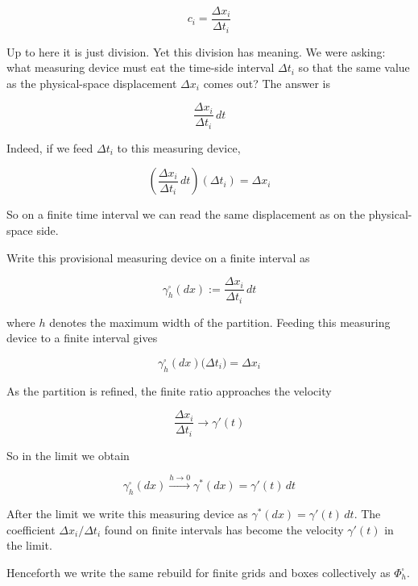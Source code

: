 \[c_i = \frac{\Delta x_i}{\Delta t_i}\]

Up to here it is just division. Yet this division has meaning. We were
asking: what measuring device must eat the time-side interval
\(\Delta t_i\) so that the same value as the physical-space displacement
\(\Delta x_i\) comes out? The answer is

\[\frac{\Delta x_i}{\Delta t_i}\,dt\]

Indeed, if we feed \(\Delta t_i\) to this measuring device,

\[\left(\frac{\Delta x_i}{\Delta t_i}\,dt\right)(\Delta t_i)=\Delta x_i\]

So on a finite time interval we can read the same displacement as on the
physical-space side.

Write this provisional measuring device on a finite interval as

\[\gamma_h^\square(dx):=\frac{\Delta x_i}{\Delta t_i}\,dt\]

where \(h\) denotes the maximum width of the partition. Feeding this
measuring device to a finite interval gives

\[\gamma_h^\square(dx)\bigl(\Delta t_i\bigr)=\Delta x_i\]

As the partition is refined, the finite ratio approaches the velocity

\[\frac{\Delta x_i}{\Delta t_i}\to \gamma'(t)\]

So in the limit we obtain

\[
\gamma_h^\square(dx)
\xrightarrow{h\to0}
\gamma^*(dx)
=
\gamma'(t)\,dt
\]

After the limit we write this measuring device as
\(\gamma^*(dx)=\gamma'(t)\,dt\). The coefficient
\(\Delta x_i/\Delta t_i\) found on finite intervals has become the
velocity \(\gamma'(t)\) in the limit.

Henceforth we write the same rebuild for finite grids and boxes
collectively as \(\Phi_h^\square\).

